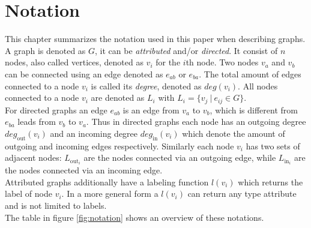 \documentclass[
    12pt,                               %
    DIV=14,                     %
    parskip=half+,              %
    bigheadings,                %
    cleardoubleempty,   %
    halfparskip,                %
    ]{scrreprt} %
\begin{document}
\chapter{Notation} \label{chap:notation}
This chapter summarizes the notation used in this paper when describing graphs. \\
A graph is denoted as $G$, it can be \textit{attributed} and/or \textit{directed}. It consist of $n$ nodes, also called vertices, denoted as $v_i$ for the $i$th node. Two nodes $v_a$ and $v_b$ can be connected using an edge denoted as $e_{ab}$ or $e_{ba}$. The total amount of edges connected to a node $v_i$ is called its \textit{degree}, denoted as $deg(v_i)$. All nodes connected to a node $v_i$ are denoted as $L_i$ with $L_i = \{v_j \: | \: e_{ij} \in G\}$. \\
For directed graphs an edge $e_{ab}$ is an edge from $v_a$ to $v_b$, which is different from $e_{ba}$ leads from $v_b$ to $v_a$. Thus in directed graphs each node has an outgoing degree $deg_{\text{out}}(v_i)$ and an incoming degree $deg_{\text{in}}(v_i)$ which denote the amount of outgoing and incoming edges respectively. Similarly each node $v_i$ has two sets of adjacent nodes: $L_{\text{out}_i}$ are the nodes connected via an outgoing edge, while $L_{\text{in}_i}$ are the nodes connected via an incoming edge. \\
Attributed graphs additionally have a labeling function $l(v_i)$ which returns the label of node $v_i$. In a more general form a $l(v_i)$ can return any type attribute and is not limited to labels. \\
The table in figure \ref{fig:notation} shows an overview of these notations. \\
\end{document}
